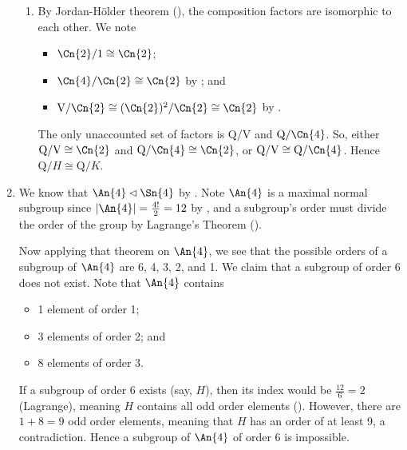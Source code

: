 \begin{enumerate}
\begin{enumerate}[label=(\roman*)]
        \item By Jordan-H\"older theorem (), the composition factors are isomorphic to each other. We note
        \begin{itemize}
            \item $\Cn{2} / 1 \cong \Cn{2}$;
            \item $\Cn{4} / \Cn{2} \cong \Cn{2}$ by ; and
            \item $\mathrm{V} / \Cn{2} \cong (\Cn{2})^2 / \Cn{2} \cong \Cn{2}$ by .
        \end{itemize}
        The only unaccounted set of factors is $\mathrm{Q}/\mathrm{V}$ and $\mathrm{Q}/\Cn{4}$. So, either $\mathrm{Q}/\mathrm{V} \cong \Cn{2}$ and $\mathrm{Q}/\Cn{4} \cong \Cn{2}$, or $\mathrm{Q}/\mathrm{V} \cong \mathrm{Q}/\Cn{4}$. Hence $\mathrm{Q}/H \cong \mathrm{Q}/K$.
    \end{enumerate}
    
    \item We know that $\An{4} \lhd \Sn{4}$ by . Note $\An{4}$ is a maximal normal subgroup since $|\An{4}| = \frac{4!}2 = 12$ by , and a subgroup's order must divide the order of the group by Lagrange's Theorem ().
    
    Now applying that theorem on $\An{4}$, we see that the possible orders of a subgroup of $\An{4}$ are 6, 4, 3, 2, and 1. We claim that a subgroup of order 6 does not exist. Note that $\An{4}$ contains
    \begin{itemize}
        \item 1 element of order 1;
        \item 3 elements of order 2; and
        \item 8 elements of order 3.
    \end{itemize}
    If a subgroup of order 6 exists (say, $H$), then its index would be $\frac{12}{6} = 2$ (Lagrange), meaning $H$ contains all odd order elements (). However, there are $1 + 8 = 9$ odd order elements, meaning that $H$ has an order of at least 9, a contradiction. Hence a subgroup of $\An{4}$ of order 6 is impossible.
    

\end{enumerate}
